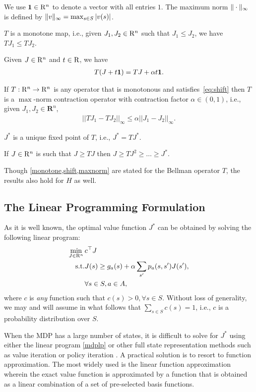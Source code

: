 We use $\mathbf{1} \in \mathrm{R}^n$ to denote a vector with all entries $1$.
The maximum norm $\|\cdot\|_{\infty}$ is defined by $ \|v\|_{\infty} = \max_{s\in S} |v(s)|$.
\begin{lemma}\label{monotone}
$T$ is a monotone map, i.e., given $J_1,J_2 \in \mathrm{R}^n$ such that $J_1\leq J_2$, we have $T J_1\leq T J_2$. 
\end{lemma}
\begin{lemma}\label{shift}
Given $J\in \mathrm{R}^n$ and $t \in \mathrm{R}$, we have
\begin{align}\label{eq:shift}
T(J+t\one)=TJ+\alpha t\one.
\end{align}
\end{lemma}
\begin{lemma}\label{maxnorm}
If $T: \mathrm{R}^n \to \mathrm{R}^n$ is any operator that is monotonous and satisfies~\eqref{eq:shift} then 
$T$ is a $\max$-norm contraction operator with contraction factor $\alpha \in (0,1)$, i.e., given $J_1, J_2 \in \mathbf{R}^n$,
\begin{align}
||TJ_1-TJ_2||_\infty\leq \alpha ||J_1-J_2||_\infty.
\end{align}
\end{lemma}
\begin{lemma}\label{uniquesol} 
$J^*$ is a unique fixed point of $T$, i.e., $J^*=TJ^*$.
\end{lemma}
\begin{corollary}
If $J\in \mathrm{R}^n$ is such that $J\geq TJ$ then $J\geq TJ^2\geq \ldots \geq J^*$.
\end{corollary}
Though  \cref{monotone,shift,maxnorm} are stated for the Bellman operator $T$, the results also hold for $H$ as well.

\subsection{The Linear Programming Formulation}
As it is well known, the optimal value function $J^*$ can be obtained by solving the following linear program:
\begin{align}\label{mdplp}
\min_{J\in \R^n}\, &c^\top J\\
\text{s.t.}\mb &J(s)\geq g_a(s)+\alpha\sum_{s'}p_a(s,s')J(s'),\nn\\
&\forall s \in S, a \in A,
\end{align}
where $c$ is \emph{any} function such that $c(s)>0, \forall s \in S$. Without loss of generality, we may and will assume in what follows that $\sum_{s\in S}c(s)=1$, i.e., $c$ is a probability distribution over $S$.

When the MDP has a large number of states, it is difficult to solve for $J^*$ using either the linear program \eqref{mdplp} or other full state representation methods such as value iteration or policy iteration \cite{BertB}. A practical solution is to resort to function approximation. The most widely used is the linear function approximation wherein the exact value function is approximated by a function that is obtained as a linear combination of a set of pre-selected basis functions.
